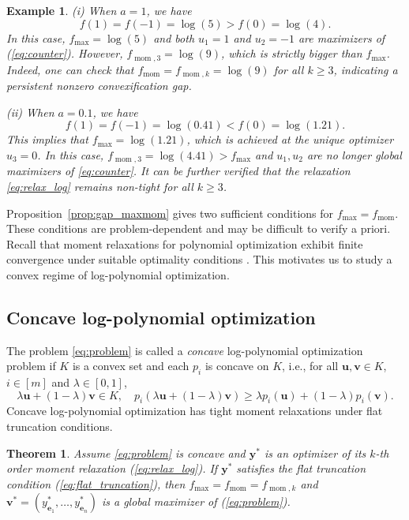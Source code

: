 \documentclass[pdflatex,sn-mathphys-num]{sn-jnl}%
\newcommand{\reff}[1]{(\ref{#1})}
\newcommand{\rd}[1]{{\color{red}#1}}
\newcommand{\vect}[1]{\boldsymbol{#1}}
\newcommand{\ddd}{,\ldots,}
\theoremstyle{thmstyleone}%
\newtheorem{theorem}{Theorem}%
\theoremstyle{thmstyletwo}%
\newtheorem{example}{Example}%
\theoremstyle{thmstylethree}%
\begin{document}
\begin{example}
	(i) When $a = 1$, we have
	\[
	f(1) = f(-1) = \log(5)>f(0) = \log(4).
	\]
	In this case, $f_{\max} = \log(5)$ and 
	both $u_1 = 1$ and $u_2 = -1$ are maximizers of (\ref{eq:counter}).
	However, $f_{\operatorname{mom},3} = \log(9)$, 
	which is strictly bigger than $f_{\max}$.
	Indeed, one can check that 
	$f_{\operatorname{mom}} = f_{\operatorname{mom},k} = \log(9)$ 
	for all $k\ge 3$, \rd{indicating a persistent nonzero convexification gap.}
	
	(ii) When $a = 0.1$, we have
	\[
	f(1) =  f(-1) = \log (0.41)< f(0) = \log (1.21).
	\]
	This implies that $f_{\max} = \log(1.21)$,
	which is achieved at the unique optimizer $u_3 = 0$.
	In this case, $f_{\operatorname{mom},3} = \log (4.41)>f_{\max}$ 
	and $u_1,u_2$ are no longer global maximizers of \eqref{eq:counter}.
	It can be further verified that the relaxation \eqref{eq:relax_log} 
	remains non-tight for all $k\ge 3$.
\end{example}

Proposition~\ref{prop:gap_maxmom} gives two sufficient conditions for 
$f_{\max} = f_{\operatorname{mom}}$.
These conditions are problem-dependent and may be difficult to
verify a priori.
Recall that moment relaxations for polynomial optimization exhibit
finite convergence under suitable optimality conditions
\cite{nie2014optimality}. This motivates us to study a convex regime
of log-polynomial optimization.



\subsection{Concave log-polynomial optimization}

The problem \eqref{eq:problem} is called a {\it concave} log-polynomial 
optimization problem if $K$ is a convex set and 
each $p_i$ is concave on $K$, i.e., 
for all $\vect{u},\vect{v}\in K$, $i\in[m]$ and $\lambda\in[0,1]$,
\[
\lambda \vect{u}+(1-\lambda)\vect{v}\in K,\quad
p_i(\lambda \vect{u}+(1-\lambda)\vect{v})\ge  \lambda p_i(\vect{u})+(1-\lambda)p_i(\vect{v}).
\]
Concave log-polynomial optimization has tight moment relaxations 
under flat truncation conditions.

\begin{theorem}   \label{thm:concave}
	Assume \eqref{eq:problem} is concave and 
	$\vect{y}^*$ is an optimizer of its $k$-th order moment relaxation \reff{eq:relax_log}.
	If $\vect{y}^*$ satisfies the flat truncation condition \reff{eq:flat_truncation},
	then $f_{\max} = f_{\operatorname{mom}} = f_{\operatorname{mom},k}$ 
	and $\vect{v}^* = (y^*_{\vect{e}_1}\ddd y^*_{\vect{e}_n})$
	is a global maximizer of \reff{eq:problem}.
\end{theorem}
\end{document}
